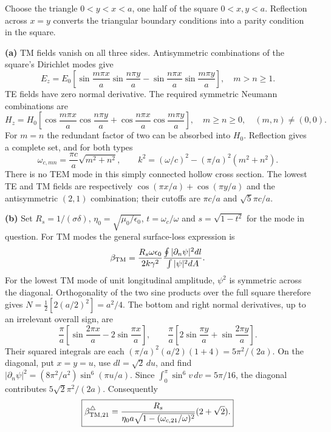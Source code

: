 Choose the triangle $0<y<x<a$, one half of the square
$0<x,y<a$.  Reflection across $x=y$ converts the triangular
boundary conditions into a parity condition in the square.

\textbf{(a)} TM fields vanish on all three sides.  Antisymmetric
combinations of the square's Dirichlet modes give
\[
E_z=E_0\left[\sin\frac{m\pi x}{a}\sin\frac{n\pi y}{a}
-\sin\frac{n\pi x}{a}\sin\frac{m\pi y}{a}\right],
\quad m>n\geq1.
\]
TE fields have zero normal derivative.  The required symmetric
Neumann combinations are
\[
H_z=H_0\left[\cos\frac{m\pi x}{a}\cos\frac{n\pi y}{a}
+\cos\frac{n\pi x}{a}\cos\frac{m\pi y}{a}\right],
\quad m\geq n\geq0,\quad(m,n)\ne(0,0).
\]
For $m=n$ the redundant factor of two can be absorbed into $H_0$.
Reflection gives a complete set, and for both types
\[
\boxed{\omega_{c,mn}=\frac{\pi c}{a}\sqrt{m^2+n^2},\qquad
k^2=(\omega/c)^2-(\pi/a)^2(m^2+n^2).}
\]
There is no TEM mode in this simply connected hollow cross section.
The lowest TE and TM fields are respectively
$\cos(\pi x/a)+\cos(\pi y/a)$ and the antisymmetric $(2,1)$
combination; their cutoffs are $\pi c/a$ and $\sqrt5\pi c/a$.

\textbf{(b)} Set $R_s=1/(\sigma\delta)$, $\eta_0=\sqrt{\mu_0/\epsilon_0}$,
$t=\omega_c/\omega$ and $s=\sqrt{1-t^2}$ for the mode in question.
For TM modes the general surface-loss expression is
\[
\beta_{\rm TM}=\frac{R_s\omega\epsilon_0}{2k\gamma^2}
\frac{\oint|\partial_n\psi|^2dl}{\int|\psi|^2dA}.
\]
For the lowest TM mode of unit longitudinal amplitude,
$\psi^2$ is symmetric across the diagonal. Orthogonality of the
two sine products over the full square therefore gives
$N=\tfrac12[2(a/2)^2]=a^2/4$. The bottom and right normal
derivatives, up to an irrelevant overall sign, are
\[
\frac{\pi}{a}\left[\sin\frac{2\pi x}{a}-2\sin\frac{\pi x}{a}\right],
\qquad
\frac{\pi}{a}\left[2\sin\frac{\pi y}{a}+\sin\frac{2\pi y}{a}\right].
\]
Their squared integrals are each
$(\pi/a)^2(a/2)(1+4)=5\pi^2/(2a)$. On the diagonal, put
$x=y=u$, use $dl=\sqrt2\,du$, and find
$|\partial_n\psi|^2=(8\pi^2/a^2)\sin^6(\pi u/a)$.
Since $\int_0^\pi\sin^6v\,dv=5\pi/16$, the diagonal contributes
$5\sqrt2\pi^2/(2a)$.  Consequently
\[
\boxed{\beta_{{\rm TM},21}^{\triangle}
=\frac{R_s}{\eta_0a\sqrt{1-(\omega_{c,21}/\omega)^2}}
(2+\sqrt2).}
\]

